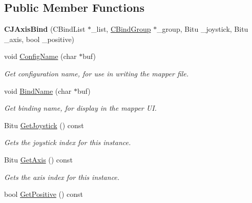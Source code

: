\subsection*{Public Member Functions}
\begin{DoxyCompactItemize}
\item 
\hypertarget{classCJAxisBind_a80b5b1ae676d9282c7ca3db9d54a9cd6}{{\bfseries C\-J\-Axis\-Bind} (C\-Bind\-List $\ast$\-\_\-list, \hyperlink{classCBindGroup}{C\-Bind\-Group} $\ast$\-\_\-group, Bitu \-\_\-joystick, Bitu \-\_\-axis, bool \-\_\-positive)}\label{classCJAxisBind_a80b5b1ae676d9282c7ca3db9d54a9cd6}

\item 
\hypertarget{classCJAxisBind_a177d6d9c27c002c88b1a05cd3d31d065}{void \hyperlink{classCJAxisBind_a177d6d9c27c002c88b1a05cd3d31d065}{Config\-Name} (char $\ast$buf)}\label{classCJAxisBind_a177d6d9c27c002c88b1a05cd3d31d065}

\begin{DoxyCompactList}\small\item\em Get configuration name, for use in writing the mapper file. \end{DoxyCompactList}\item 
\hypertarget{classCJAxisBind_aec1508a8f00bb7b5f4aa5a42c33fe973}{void \hyperlink{classCJAxisBind_aec1508a8f00bb7b5f4aa5a42c33fe973}{Bind\-Name} (char $\ast$buf)}\label{classCJAxisBind_aec1508a8f00bb7b5f4aa5a42c33fe973}

\begin{DoxyCompactList}\small\item\em Get binding name, for display in the mapper U\-I. \end{DoxyCompactList}\item 
\hypertarget{classCJAxisBind_a033065f2f64ac52bfac7bf1d0aff17c3}{Bitu \hyperlink{classCJAxisBind_a033065f2f64ac52bfac7bf1d0aff17c3}{Get\-Joystick} () const }\label{classCJAxisBind_a033065f2f64ac52bfac7bf1d0aff17c3}

\begin{DoxyCompactList}\small\item\em Gets the joystick index for this instance. \end{DoxyCompactList}\item 
\hypertarget{classCJAxisBind_a6d9c9e742943700c75971a13bd827d42}{Bitu \hyperlink{classCJAxisBind_a6d9c9e742943700c75971a13bd827d42}{Get\-Axis} () const }\label{classCJAxisBind_a6d9c9e742943700c75971a13bd827d42}

\begin{DoxyCompactList}\small\item\em Gets the axis index for this instance. \end{DoxyCompactList}\item 
\hypertarget{classCJAxisBind_a8693e360c96fe5f86d2cd46eb1f9cf6e}{bool \hyperlink{classCJAxisBind_a8693e360c96fe5f86d2cd46eb1f9cf6e}{Get\-Positive} () const }\label{classCJAxisBind_a8693e360c96fe5f86d2cd46eb1f9cf6e}


\end{DoxyCompactItemize}
